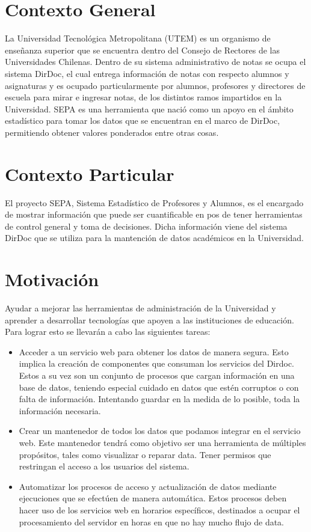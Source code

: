 \documentclass[a4paper,12pt,openany,oneside]{book}
\begin{document}
\section{Contexto General}
La Universidad Tecnológica Metropolitana (UTEM) es un organismo de enseñanza superior que se encuentra dentro del Consejo de Rectores de las Universidades Chilenas. Dentro de su sistema administrativo de notas se ocupa el sistema DirDoc, el cual entrega información de notas con respecto alumnos y asignaturas y es ocupado particularmente por alumnos, profesores y directores de escuela para  mirar e ingresar notas, de los distintos ramos impartidos en la Universidad. SEPA es una herramienta que nació como un apoyo en el ámbito estadístico para tomar los datos que se encuentran en el marco de DirDoc, permitiendo obtener valores ponderados entre otras cosas.
\section{Contexto Particular}
El proyecto SEPA, Sistema Estadístico de Profesores y Alumnos, es el encargado de mostrar información que puede ser cuantificable en pos de tener herramientas de control general y toma de decisiones. Dicha información viene del sistema DirDoc que se utiliza para la mantención de datos académicos en la Universidad.

\section{Motivación}
Ayudar a mejorar las herramientas de administración de la Universidad y aprender a desarrollar tecnologías que apoyen a las instituciones de educación.
Para lograr esto se llevarán a cabo las siguientes tareas:
\begin{itemize}
	\item Acceder a un servicio web para obtener los datos de manera segura. Esto implica la creación de componentes que consuman los servicios del Dirdoc. Estos a su vez son un conjunto de procesos que cargan información en una base de datos, teniendo especial cuidado en datos que estén corruptos o con falta de información. Intentando guardar en la medida de lo posible, toda la información necesaria.
	\item Crear un mantenedor de todos los datos que podamos integrar en el servicio web. Este mantenedor tendrá como objetivo ser una herramienta de múltiples propósitos, tales como visualizar o reparar data. Tener permisos que restringan el acceso a los usuarios del sistema.
	\item Automatizar los procesos de acceso y actualización de datos mediante ejecuciones que se efectúen de manera automática. Estos procesos deben hacer uso de los servicios web en horarios específicos, destinados a ocupar el procesamiento del servidor en horas en que no hay mucho flujo de data.
\end{itemize}
\end{document}
